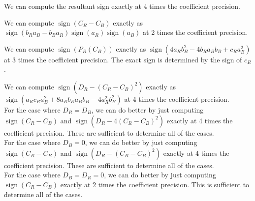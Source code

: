 \documentclass{article}
\DeclareMathOperator{\sign}{sign}
\begin{document}
\noindent
We can compute the resultant sign exactly at 4 times the coefficient
precision.

\noindent
We can compute $\sign(C_R-C_B)$ exactly as $\sign(b_R a_B - b_B
a_R)\sign(a_R)\sign(a_B)$ at 2 times the coefficient precision.

\noindent
We can compute $\sign(P_R(C_B))$ exactly as $\sign(4 a_R b_B^2 - 4 b_R
a_B b_B + c_R a_B^2)$ at 3 times the coefficient precision.  The exact sign is determined by the sign of $c_R$.

\noindent
We can compute $\sign(D_R-(C_R-C_B)^2)$ exactly as $\sign(a_R c_R
a_B^2 + 8a_R b_R a_B b_B - 4 a_R^2 b_B^2)$ at 4 times the coefficient
precision.\\

\noindent
For the case where $D_R=D_B$, we can do better by just computing
$\sign(C_R-C_B)$ and $\sign(D_R-4(C_R-C_B)^2)$ exactly at 4 times the
coefficient precision. These are sufficient to determine all of the
cases.\\

\noindent
For the case where $D_B=0$, we can do better by just computing
$\sign(C_R-C_B)$ and $\sign(D_R-(C_R-C_B)^2)$ exactly at 4 times the
coefficient precision. These are sufficient to determine all of the
cases.\\

\noindent
For the case where $D_B=D_R=0$, we can do better by just computing
$\sign(C_R-C_B)$ exactly at 2 times the coefficient precision. This is
sufficient to determine all of the cases.
\end{document}
